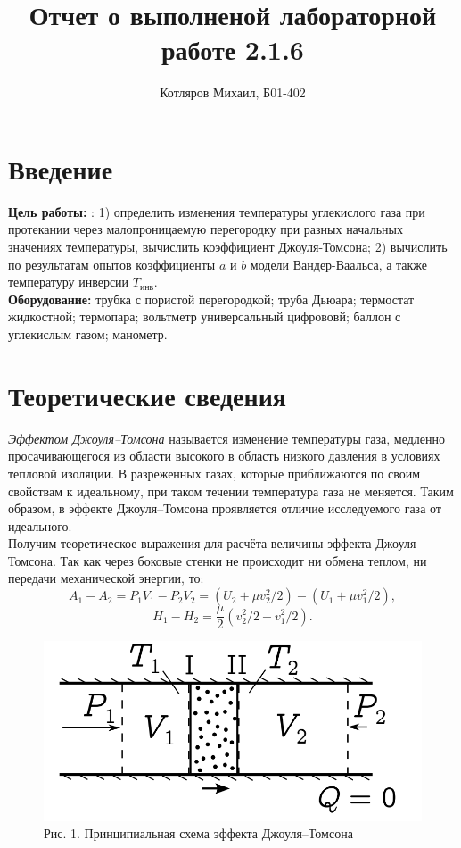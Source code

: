 \documentclass[a4paper]{article}
\title{\textbf{Отчет о выполненой лабораторной работе 2.1.6}}
\date{}
\author{Котляров Михаил, Б01-402}
\begin{document}
\maketitle
	
	\section{Введение}
	
	\textbf{Цель работы:} : 1) определить изменения температуры углекислого газа при протекании через малопроницаемую перегородку при разных начальных значениях температуры, вычислить коэффициент Джоуля-Томсона; 2) вычислить по результатам опытов коэффициенты $a$ и $b$ модели Вандер-Ваальса, а также температуру инверсии $T_{\text{инв}}$.\\

	\textbf{Оборудование:} трубка с пористой перегородкой; труба Дьюара; термостат
жидкостной; термопара; вольтметр универсальный цифрововй; баллон с углекислым газом; манометр.
	
	\section{Теоретические сведения}
\textit{Эффектом Джоуля–Томсона} называется изменение температуры газа, медленно
просачивающегося из области высокого в область низкого давления в условиях тепловой изоляции. В разреженных газах, которые приближаются по своим свойствам
к идеальному, при таком течении температура газа не меняется. Таким образом, в
эффекте Джоуля–Томсона проявляется отличие исследуемого газа от идеального.\\
Получим теоретическое выражения для расчёта величины эффекта Джоуля–Томсона.
Так как через боковые стенки не происходит ни обмена теплом, ни передачи механической энергии, то:
\begin{equation*}
	A_1-A_2 = P_1V_1-P_2V_2 = (U_2 + \mu v_2^2/2) - (U_1+\mu v_1^2/2),
\end{equation*}
\begin{equation*}
	H_1-H_2 = \frac{\mu}{2} (v_2^2/2 - v_1^2/2).
\end{equation*}
\begin{figure}[h!]
        \centering
        \includegraphics[scale=0.5]{Scheme.png}
        \caption{
        Рис. 1. Принципиальная схема эффекта Джоуля–Томсона
        }
 \end{figure} 
\end{document}
